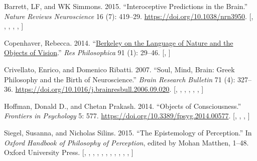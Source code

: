 \documentclass[
  12pt,
  a4paper,
  oneside,
  titlepage,
  toclink=all,
  toc=bibliography]{scrbook}
\newlength{\cslhangindent}
\newlength{\cslentryspacingunit} %
\newenvironment{CSLReferences}[2] %
 {%
  \setlength{\parindent}{0pt}
  \ifodd #1
  \let\oldpar\par
  \def\par{\hangindent=\cslhangindent\oldpar}
  \fi
  \setlength{\parskip}{#2\cslentryspacingunit}
 }%
 {}
\theoremstyle{definition}
\theoremstyle{plain}
\theoremstyle{plain}
\theoremstyle{plain}
\theoremstyle{plain}
\theoremstyle{definition}
\theoremstyle{definition}
\theoremstyle{plain}
\theoremstyle{remark}
\begin{document}
\hypertarget{refs_scriv129}{}
\begin{CSLReferences}{1}{0}
\leavevmode{}%
Barrett, LF, and WK Simmons. 2015. {``Interoceptive Predictions in the
Brain.''} \emph{Nature Reviews Neuroscience} 16 (7): 419--29.
\url{https://doi.org/10.1038/nrn3950}.
{[},
\protect\hyperlink{cite_109}{\pageref{cite_109}},
\protect\hyperlink{cite_114}{\pageref{cite_114}},
\protect\hyperlink{cite_115}{\pageref{cite_115}},
\protect\hyperlink{cite_116}{\pageref{cite_116}},
\protect\hyperlink{cite_145}{\pageref{cite_145}}{]}

\leavevmode{}%
Copenhaver, Rebecca. 2014. {``\href{}{Berkeley on the Language of Nature
and the Objects of Vision}.''} \emph{Res Philosophica} 91 (1): 29--46.
{[},
\protect\hyperlink{cite_114}{\pageref{cite_114}}{]}

\leavevmode{}%
Crivellato, Enrico, and Domenico Ribatti. 2007. {``Soul, Mind, Brain:
Greek Philosophy and the Birth of Neuroscience.''} \emph{Brain Research
Bulletin} 71 (4): 327--36.
\url{https://doi.org/10.1016/j.brainresbull.2006.09.020}.
{[},
\protect\hyperlink{cite_108}{\pageref{cite_108}},
\protect\hyperlink{cite_109}{\pageref{cite_109}},
\protect\hyperlink{cite_112}{\pageref{cite_112}},
\protect\hyperlink{cite_116}{\pageref{cite_116}},
\protect\hyperlink{cite_135}{\pageref{cite_135}},
\protect\hyperlink{cite_145}{\pageref{cite_145}}{]}

\leavevmode{}%
Hoffman, Donald D., and Chetan Prakash. 2014. {``Objects of
Consciousness.''} \emph{Frontiers in Psychology} 5: 577.
\url{https://doi.org/10.3389/fpsyg.2014.00577}.
{[},
\protect\hyperlink{cite_90}{\pageref{cite_90}},
\protect\hyperlink{cite_91}{\pageref{cite_91}},
\protect\hyperlink{cite_114}{\pageref{cite_114}}{]}

\leavevmode{}%
Siegel, Susanna, and Nicholas Silins. 2015. {``The Epistemology of
Perception.''} In \emph{Oxford Handbook of Philosophy of Perception},
edited by Mohan Matthen, 1--48. Oxford University Press.
{[},
\protect\hyperlink{cite_114}{\pageref{cite_114}},
\protect\hyperlink{cite_121}{\pageref{cite_121}},
\protect\hyperlink{cite_122}{\pageref{cite_122}},
\protect\hyperlink{cite_126}{\pageref{cite_126}},
\protect\hyperlink{cite_130}{\pageref{cite_130}},
\protect\hyperlink{cite_136}{\pageref{cite_136}},
\protect\hyperlink{cite_141}{\pageref{cite_141}},
\protect\hyperlink{cite_142}{\pageref{cite_142}},
\protect\hyperlink{cite_143}{\pageref{cite_143}},
\protect\hyperlink{cite_144}{\pageref{cite_144}},
\protect\hyperlink{cite_145}{\pageref{cite_145}}{]}


\end{CSLReferences}
\end{document}
